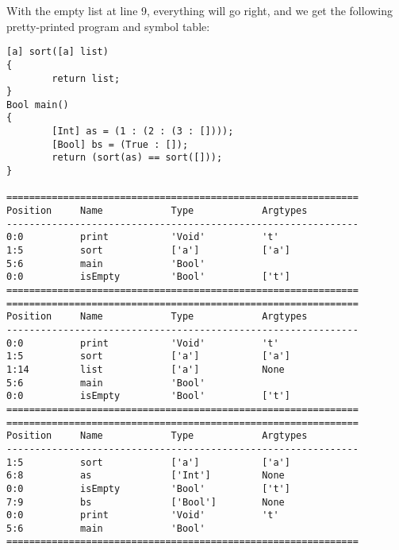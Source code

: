 \documentclass[a4paper]{article}
\begin{document}
With the empty list at line 9, everything will go right, and we get the following pretty-printed program and symbol table: 

\begin{verbatim}
[a] sort([a] list)
{
        return list;
}
Bool main()
{
        [Int] as = (1 : (2 : (3 : [])));
        [Bool] bs = (True : []);
        return (sort(as) == sort([]));
}

==============================================================
Position     Name            Type            Argtypes            
--------------------------------------------------------------
0:0          print           'Void'          't'                 
1:5          sort            ['a']           ['a']               
5:6          main            'Bool'                              
0:0          isEmpty         'Bool'          ['t']               
==============================================================
==============================================================
Position     Name            Type            Argtypes            
--------------------------------------------------------------
0:0          print           'Void'          't'                 
1:5          sort            ['a']           ['a']               
1:14         list            ['a']           None                
5:6          main            'Bool'                              
0:0          isEmpty         'Bool'          ['t']               
==============================================================
==============================================================
Position     Name            Type            Argtypes            
--------------------------------------------------------------
1:5          sort            ['a']           ['a']               
6:8          as              ['Int']         None                
0:0          isEmpty         'Bool'          ['t']               
7:9          bs              ['Bool']        None                
0:0          print           'Void'          't'                 
5:6          main            'Bool'                              
==============================================================
\end{verbatim}
\end{document}
